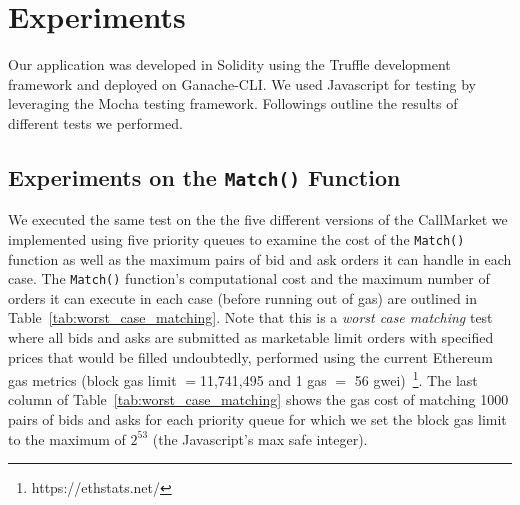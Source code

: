 \section{Experiments}

Our application was developed in Solidity using the Truffle development framework and deployed on Ganache-CLI. We used Javascript for testing by leveraging the Mocha testing framework. Followings outline the results of different tests we performed.


 \subsection{Experiments on the \texttt{Match()} Function}

We executed the same test on the the five different versions of the CallMarket we implemented using five priority queues to examine the cost of the \texttt{Match()} function as well as the maximum pairs of bid and ask orders it can handle in each case. The \texttt{Match()} function's computational cost and the maximum number of orders it can execute in each case (before running out of gas) are outlined in Table~\ref{tab:worst_case_matching}. Note that this is a \textit{worst case matching} test where all bids and asks are submitted as marketable limit orders with specified prices that would be filled undoubtedly, performed using the current Ethereum gas metrics (block gas limit $=$11,741,495 and 1 gas $=$ 56 gwei)~\footnote{https://ethstats.net/}. The last column of Table~\ref{tab:worst_case_matching} shows the gas cost of matching 1000 pairs of bids and asks for each priority queue for which we set the block gas limit to the maximum of  $2^{53}$ (the Javascript's max safe integer).



